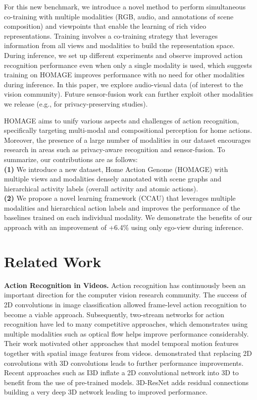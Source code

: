 \documentclass[final]{cvpr}
\begin{document}
For this new benchmark, we introduce a novel method to perform simultaneous co-training with multiple modalities (RGB, audio, and annotations of scene composition) and viewpoints that enable the learning of rich video representations. Training involves a co-training strategy that leverages information from all views and modalities to build the representation space. During inference, we set up different experiments and observe improved action recognition performance even when only a single modality is used, which suggests training on HOMAGE improves performance with no need for other modalities during inference. In this paper, we explore audio-visual data (of interest to the vision community). Future sensor-fusion work can further exploit other modalities we release (e.g., for privacy-preserving studies).



HOMAGE aims to unify various aspects and challenges of action recognition, specifically targeting multi-modal and compositional perception for home actions. Moreover, the presence of a large number of modalities in our dataset encourages research in areas such as privacy-aware recognition and sensor-fusion. To summarize, our contributions are as follows: \\
\textbf{(1)} We introduce a new dataset, Home Action Genome (HOMAGE) with multiple views and modalities densely annotated with scene graphs and hierarchical activity labels (overall activity and atomic actions). \\
\textbf{(2)} We propose a novel learning framework (CCAU) that leverages multiple modalities and hierarchical action labels and improves the performance of the baselines trained on each individual modality. We demonstrate the benefits of our approach with an improvement of +6.4\% using only ego-view during inference. 


\section{Related Work}

\noindent\textbf{Action Recognition in Videos.} Action recognition has continuously been an important direction for the computer vision research community. The success of 2D convolutions in image classification allowed frame-level action recognition to become a viable approach. Subsequently, two-stream networks for action recognition \cite{simonyanTwoStream14} have led to many competitive approaches, which demonstrates using multiple modalities such as optical flow helps improve performance considerably. Their work motivated other approaches that model temporal motion features together with spatial image features from videos. \cite{tran2015learning, varol2017long} demonstrated that replacing 2D convolutions with 3D convolutions leads to further performance improvements. Recent approaches such as I3D \cite{carreira2018action} inflate a 2D convolutional network into 3D to benefit from the use of pre-trained models. 3D-ResNet \cite{hara2018can} adds residual connections building a very deep 3D network leading to improved performance.
\end{document}
